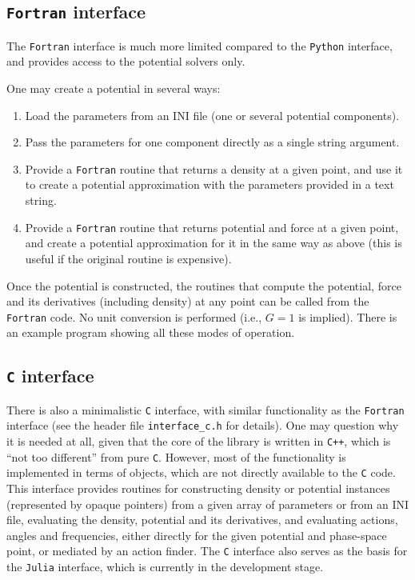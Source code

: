 \documentclass[12pt]{article}
\newcommand{\Cpp}  {\texttt{C++}\xspace}
\newcommand{\Python}{\texttt{Python}\xspace}
\newcommand{\Fortran}{\texttt{Fortran}\xspace}
\begin{document}
\subsection{\Fortran interface}  \label{sec:Fortran}

The \Fortran interface is much more limited compared to the \Python interface, and provides access to the potential solvers only. 

One may create a potential in several ways:
\begin{enumerate}  \setlength{\parskip}{2pt} \setlength{\itemsep}{2pt}
\item Load the parameters from an INI file (one or several potential components).
\item Pass the parameters for one component directly as a single string argument.
\item Provide a \Fortran routine that returns a density at a given point, and use it to create a potential approximation with the parameters provided in a text string.
\item Provide a \Fortran routine that returns potential and force at a given point, and create a potential approximation for it in the same way as above (this is useful if the original routine is expensive).
\end{enumerate}
Once the potential is constructed, the routines that compute the potential, force and its derivatives (including density) at any point can be called from the \Fortran code. No unit conversion is performed (i.e., $G=1$ is implied).
There is an example program showing all these modes of operation.


\subsection{\texttt{C} interface}  \label{sec:C}

There is also a minimalistic \texttt{C} interface, with similar functionality as the \Fortran interface (see the header file \texttt{interface_c.h} for details). One may question why it is needed at all, given that the core of the library is written in \Cpp, which is ``not too different'' from pure \texttt{C}. However, most of the functionality is implemented in terms of objects, which are not directly available to the \texttt{C} code. This interface provides routines for constructing density or potential instances (represented by opaque pointers) from a given array of parameters or from an INI file, evaluating the density, potential and its derivatives, and evaluating actions, angles and frequencies, either directly for the given potential and phase-space point, or mediated by an action finder. The \texttt{C} interface also serves as the basis for the \texttt{Julia} interface, which is currently in the development stage.
\end{document}
